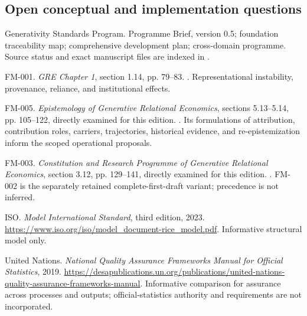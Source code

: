 \documentclass[11pt,a4paper]{article}
\begin{document}
\subsection{Open conceptual and implementation questions}

\GSPbibliography
\begin{enumerate}[label={[\arabic*]}]
\item Generativity Standards Program. Programme Brief, version 0.5; foundation traceability map; comprehensive development plan; cross-domain programme. Source status and exact manuscript files are indexed in .
\item FM-001. \emph{GRE Chapter 1}, section 1.14, pp. 79--83. . Representational instability, provenance, reliance, and institutional effects.
\item FM-005. \emph{Epistemology of Generative Relational Economics}, sections 5.13--5.14, pp. 105--122, directly examined for this edition. . Its formulations of attribution, contribution roles, carriers, trajectories, historical evidence, and re-epistemization inform the scoped operational proposals.
\item FM-003. \emph{Constitution and Research Programme of Generative Relational Economics}, section 3.12, pp. 129--141, directly examined for this edition. . FM-002 is the separately retained complete-first-draft variant; precedence is not inferred.
\item ISO. \emph{Model International Standard}, third edition, 2023. \url{https://www.iso.org/iso/model_document-rice_model.pdf}. Informative structural model only.
\item United Nations. \emph{National Quality Assurance Frameworks Manual for Official Statistics}, 2019. \url{https://desapublications.un.org/publications/united-nations-quality-assurance-frameworks-manual}. Informative comparison for assurance across processes and outputs; official-statistics authority and requirements are not incorporated.
\end{enumerate}
\end{document}
